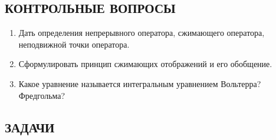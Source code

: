 \documentclass[12pt,a4paper]{article}
\begin{document}
\subsection*{КОНТРОЛЬНЫЕ ВОПРОСЫ}
\begin{enumerate}
\item Дать определения непрерывного оператора, сжимающего оператора, неподвижной точки оператора.
\item Сформулировать принцип сжимающих отображений и его обобщение.
\item Какое уравнение называется интегральным уравнением Вольтерра? Фредгольма?
\end{enumerate}

\subsection*{ЗАДАЧИ}
\end{document}
